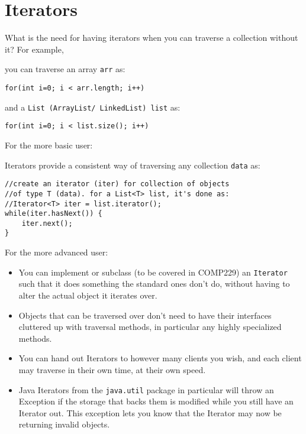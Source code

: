 \documentclass{exam}
\begin{document}
\section*{Iterators}
\begin{questions}
\question What is the need for having iterators when you can traverse a collection without it? For example, 

you can traverse an array \texttt{arr} as:

\begin{lstlisting}[numbers=none]
for(int i=0; i < arr.length; i++)
\end{lstlisting} 

and a \texttt{List (ArrayList/ LinkedList) list} as:

\begin{lstlisting}
for(int i=0; i < list.size(); i++)
\end{lstlisting} 

\ifprintanswers
For the more basic user:

Iterators provide a consistent way of traversing any collection \texttt{data} as:

\begin{lstlisting}
//create an iterator (iter) for collection of objects
//of type T (data). for a List<T> list, it's done as:
//Iterator<T> iter = list.iterator();
while(iter.hasNext()) {
	iter.next();
}
\end{lstlisting}

For the more advanced user:

\begin{itemize}
  \item You can implement or subclass (to be covered in COMP229) an \texttt{Iterator} such that it does something the standard ones don't do, without having to alter the actual object it iterates over.
  \item Objects that can be traversed over don't need to have their interfaces cluttered up with traversal methods, in particular any highly specialized methods.
  \item You can hand out Iterators to however many clients you wish, and each client may traverse in their own time, at their own speed.
  \item Java Iterators from the \texttt{java.util} package in particular will throw an Exception if the storage that backs them is modified while you still have an Iterator out. This exception lets you know that the Iterator may now be returning invalid objects.
\end{itemize}
\else
\fi


\end{questions}
\end{document}
